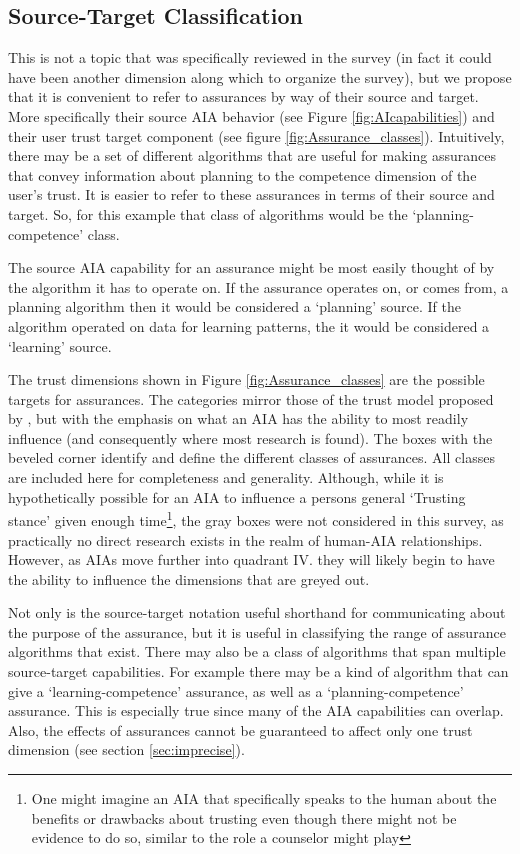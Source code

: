 \subsection{Source-Target Classification}
    This is not a topic that was specifically reviewed in the survey (in fact it could have been another dimension along which to organize the survey), but we propose that it is convenient to refer to assurances by way of their source and target. More specifically their source AIA behavior (see Figure \ref{fig:AIcapabilities}) and their user trust target component (see figure \ref{fig:Assurance_classes}). Intuitively, there may be a set of different algorithms that are useful for making assurances that convey information about planning to the competence dimension of the user's trust. It is easier to refer to these assurances in terms of their source and target. So, for this example that class of algorithms would be the `planning-competence' class.

    The source AIA capability for an assurance might be most easily thought of by the algorithm it has to operate on. If the assurance operates on, or comes from, a planning algorithm then it would be considered a `planning' source. If the algorithm operated on data for learning patterns, the it would be considered a `learning' source.

    The trust dimensions shown in Figure \ref{fig:Assurance_classes} are the possible targets for assurances. The categories mirror those of the trust model proposed by \citet{McKnight2001-fa}, but with the emphasis on what an AIA has the ability to most readily influence (and consequently where most research is found). The boxes with the beveled corner identify and define the different classes of assurances. All classes are included here for completeness and generality. Although, while it is hypothetically possible for an AIA to influence a persons general `Trusting stance' given enough time\footnote{One might imagine an AIA that specifically speaks to the human about the benefits or drawbacks about trusting even though there might not be evidence to do so, similar to the role a counselor might play}, the gray boxes were not considered in this survey, as practically no direct research exists in the realm of human-AIA relationships. However, as AIAs move further into quadrant IV. they will likely begin to have the ability to influence the dimensions that are greyed out.
    
    Not only is the source-target notation useful shorthand for communicating about the purpose of the assurance, but it is useful in classifying the range of assurance algorithms that exist. There may also be a class of algorithms that span multiple source-target capabilities. For example there may be a kind of algorithm that can give a `learning-competence' assurance, as well as a `planning-competence' assurance. This is especially true since many of the AIA capabilities can overlap. Also, the effects of assurances cannot be guaranteed to affect only one trust dimension (see section \ref{sec:imprecise}).

